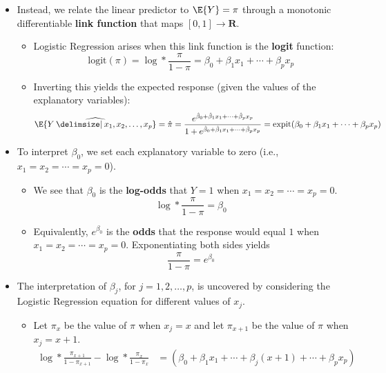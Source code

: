 \begin{itemize}
      \item Instead, we relate the linear predictor to $ \E{Y}=\pi $ through a monotonic differentiable \textbf{link function} that maps $ [0,1]\to\mathbf{R} $.
            \begin{itemize}
                  \item Logistic Regression arises when this link function is the \textbf{logit} function:
                        \[ \text{logit}(\pi)=\log*{\frac{\pi}{1-\pi}}=\beta_0+\beta_1x_1+\cdots+\beta_p x_p \]
                  \item Inverting this yields the expected response (given the values of the explanatory variables):
                        \[ \widehat{\E{Y\given x_1,x_2,\ldots,x_p}}=\hat{\pi}=\frac{e^{\hat{\beta}_0+\hat{\beta}_1 x_1+\cdots+\hat{\beta}_p x_p}}{1+e^{\hat{\beta}_0+\hat{\beta}_1 x_1+\cdots+\hat{\beta}_p x_p}}
                              =\text{expit}(\beta_0+\beta_1x_1+\cdots+\beta_p x_p)  \]
            \end{itemize}
      \item To interpret $ \beta_0 $, we set each explanatory variable to zero (i.e., $ x_1=x_2=\cdots=x_p=0 $).
            \begin{itemize}
                  \item We see that $ \beta_0 $ is the \textbf{log-odds} that $ Y=1 $ when $ x_1=x_2=\cdots=x_p=0 $.
                        \[ \log*{\frac{\pi}{1-\pi}}=\beta_0 \]
                  \item Equivalently, $ e^{\beta_0} $ is the \textbf{odds} that the response would equal $ 1 $ when $ x_1=x_2=\cdots=x_p=0 $.
                        Exponentiating both sides yields
                        \[ \frac{\pi}{1-\pi}=e^{\beta_0}  \]
            \end{itemize}
      \item The interpretation of $\beta_j$, for $ j=1,2,\ldots,p $, is uncovered by considering the Logistic Regression equation
            for different values of $ x_j $.
            \begin{itemize}
                  \item Let $ \pi_x $ be the value of $ \pi $ when $ x_j=x $ and let $ \pi_{x+1} $ be the value of $ \pi $ when $ x_j=x+1 $.
                        \begin{align*}
                              \log*{\frac{\pi_{x+1}}{1-\pi_{x+1}}}-\log*{\frac{\pi_x}{1-\pi_x}}
                               & =(\beta_0+\beta_1x_1+\cdots+\beta_j(x+1)+\cdots+\beta_p x_p) \\

\end{align*}
\end{itemize}
\end{itemize}
